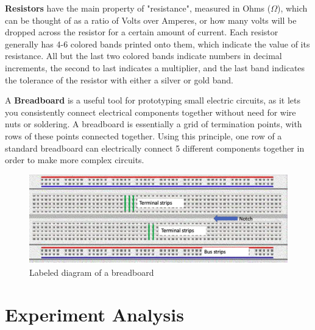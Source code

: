 \documentclass[titlepage]{article}
\begin{document}
    \textbf{Resistors} have the main property of "resistance", measured in Ohms ($\Omega$), which can be thought of as a ratio of Volts over Amperes, or how many volts will be dropped across the resistor for a certain amount of current. Each resistor generally has 4-6 colored bands printed onto them, which indicate the value of its resistance. All but the last two colored bands indicate numbers in decimal increments, the second to last indicates a multiplier, and the last band indicates the tolerance of the resistor with either a silver or gold band. \\ 
    \vspace{5pt}

    A \textbf{Breadboard} is a useful tool for prototyping small electric circuits, as it lets you consistently connect electrical components together without need for wire nuts or soldering. A breadboard is essentially a grid of termination points, with rows of these points connected together. Using this principle, one row of a standard breadboard can electrically connect 5 different components together in order to make more complex circuits.

    \begin{figure}[hbt!]
        \centering
        \caption{Labeled diagram of a breadboard}
        \includegraphics[scale = 0.2]{theory/breadboard}
    \end{figure} 




	\section{Experiment Analysis}
\end{document}
